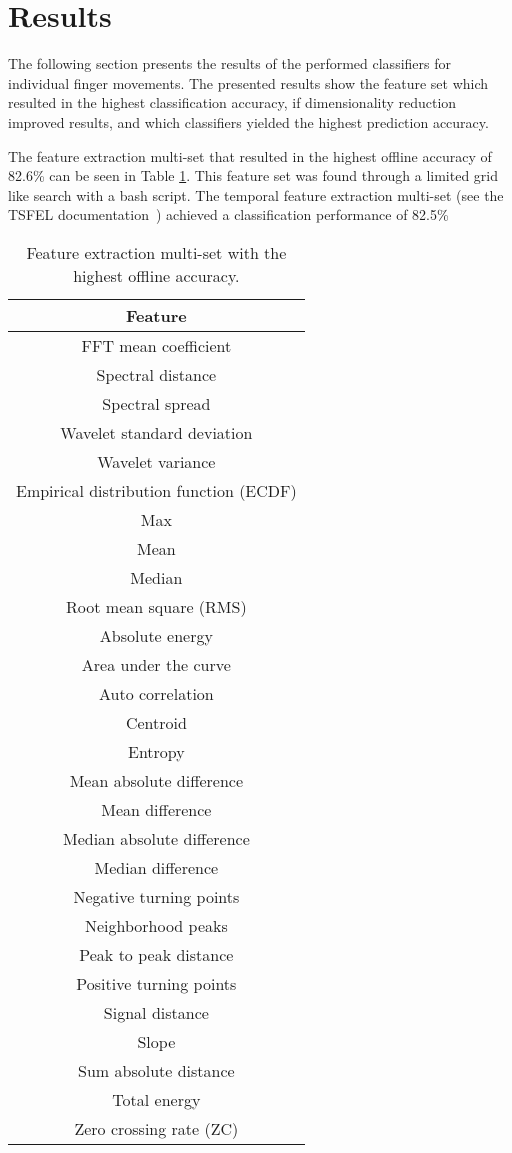 \section{Results}
\label{section:results}
The following section presents the results of the performed classifiers for individual finger movements. The presented results show the feature set which resulted in the highest classification accuracy, if dimensionality reduction improved results, and which classifiers yielded the highest prediction accuracy.

The feature extraction multi-set that resulted in the highest offline accuracy of 82.6\% can be seen in Table \ref{tab:features}. This feature set was found through a limited grid like search with a bash script.
The temporal feature extraction multi-set (see the TSFEL documentation~\cite{barandas2020tsfel}) achieved a classification performance of 82.5\%

\begin{table}[ht]
    \centering
    \begin{tabular}{c}
         \hline
         Feature \\
         \hline
         FFT mean coefficient \\
         Spectral distance \\
         Spectral spread \\
         Wavelet standard deviation \\
         Wavelet variance \\
         Empirical distribution function (ECDF) \\
         Max \\
         Mean \\
         Median \\
         Root mean square (RMS) \\
         Absolute energy \\
         Area under the curve \\
         Auto correlation \\
         Centroid \\
         Entropy \\
         Mean absolute difference \\
         Mean difference \\
         Median absolute difference \\
         Median difference \\
         Negative turning points \\
         Neighborhood peaks \\
         Peak to peak distance \\
         Positive turning points \\
         Signal distance \\
         Slope \\
         Sum absolute distance \\
         Total energy \\
         Zero crossing rate (ZC)
    \end{tabular}
    \caption{Feature extraction multi-set with the highest offline accuracy.}
    \label{tab:features}
\end{table}

